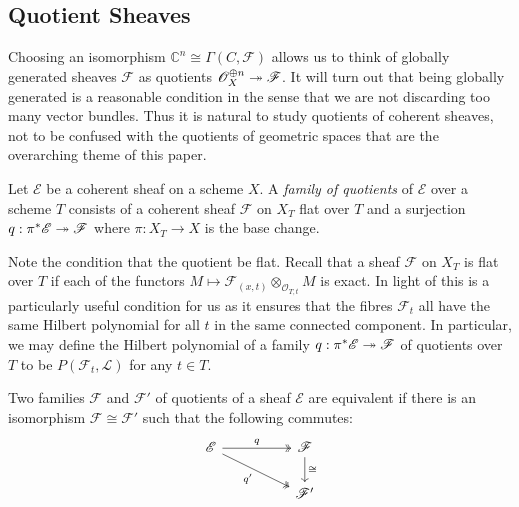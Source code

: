 \documentclass[12pt]{ociamthesis}  %
\begin{document}
\subsection{Quotient Sheaves} 

Choosing an isomorphism $\mathbb C^n \cong \Gamma(C,\mathscr F)$
allows us to think of globally generated sheaves $\mathscr F$
as quotients $\mathscr O_X^{\oplus n} \twoheadrightarrow \mathscr F$.
It will turn out that being globally generated is a reasonable
condition in the sense that we are not discarding too many
vector bundles. Thus it is natural to study quotients of coherent sheaves,
not to be confused with the quotients of geometric spaces that
are the overarching theme of this paper.

\begin{definition}
  Let $\mathscr E$ be a coherent sheaf on a scheme $X$.
  A \emph{family of quotients} of $\mathscr E$ over a scheme $T$
  consists of a coherent sheaf $\mathscr F$ on $X_T$ flat over $T$ and a
  surjection $q:\pi^*\mathscr E\twoheadrightarrow\mathscr F$ where
  $\pi : X_T \to X$ is the base change.
\end{definition}

Note the condition that the quotient be flat. Recall that a sheaf
$\mathscr F$ on $X_T$ is flat over $T$ if each of the functors
$M \mapsto \mathscr F_{(x,t)} \otimes_{\mathscr O_{T,t}} M$ is exact.
In light of \cite[III Theorem 9.9]{hartshorne1977} this is a
particularly useful condition for us as it ensures that the fibres
$\mathscr F_t$ all have the same Hilbert polynomial
for all $t$ in the same connected component. In particular,
we may define the Hilbert polynomial of a family
$q : \pi^*\mathscr E \twoheadrightarrow \mathscr F$ of quotients over $T$ to be
$P(\mathscr F_t,\mathscr L)$ for any $t\in T$.

Two families $\mathscr F$ and $\mathscr F'$ of quotients of a
sheaf $\mathscr E$ are equivalent if there is an isomorphism
$\mathscr F\cong\mathscr F'$ such that the following commutes:
\begin{equation}\label{eq:quotient_equivalence}
  \begin{tikzcd}
    {\mathscr E} && {\mathscr F} \\
    && {\mathscr F'}
    \arrow["q", two heads, from=1-1, to=1-3]
    \arrow["{q'}"', two heads, from=1-1, to=2-3]
    \arrow["\cong", from=1-3, to=2-3]
  \end{tikzcd}
\end{equation}
\end{document}
